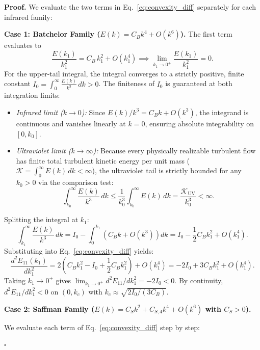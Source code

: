 \documentclass[lineno]{jfm}
\newenvironment{proof}[1][Proof]{\noindent\textbf{#1.} }{\hfill$\square$\medskip}
\begin{document}
\begin{proof}
We evaluate the two terms in Eq.~\eqref{eq:convexity_diff} separately for each infrared family:

\medskip
\noindent\textbf{Case 1: Batchelor Family ($E(k) = C_B k^4 + O(k^6)$).}
The first term evaluates to
\begin{equation}
\frac{E(k_1)}{k_1^2} = C_B\,k_1^2 + O(k_1^4) \implies \lim_{k_1 \to 0^+} \frac{E(k_1)}{k_1^2} = 0.
\end{equation}
For the upper-tail integral, the integral converges to a strictly positive, finite constant $I_0 = \int_0^\infty \frac{E(k)}{k^3}\,dk > 0$. The finiteness of $I_0$ is guaranteed at both integration limits:
\begin{itemize}
\item \emph{Infrared limit ($k \to 0$):} Since $E(k)/k^3 = C_B k + O(k^3)$, the integrand is continuous and vanishes linearly at $k=0$, ensuring absolute integrability on $[0, k_0]$.
\item \emph{Ultraviolet limit ($k \to \infty$):} Because every physically realizable turbulent flow has finite total turbulent kinetic energy per unit mass ($\mathcal{K} = \int_0^\infty E(k)\,dk < \infty$), the ultraviolet tail is strictly bounded for any $k_0 > 0$ via the comparison test:
\begin{equation}
\int_{k_0}^\infty \frac{E(k)}{k^3}\,dk \le \frac{1}{k_0^3} \int_{k_0}^\infty E(k)\,dk = \frac{\mathcal{K}_{\text{UV}}}{k_0^3} < \infty.
\end{equation}
\end{itemize}
Splitting the integral at $k_1$:
\begin{equation}
\int_{k_1}^\infty \frac{E(k)}{k^3}\,dk = I_0 - \int_0^{k_1} \left( C_B k + O(k^3) \right) dk = I_0 - \frac{1}{2} C_B k_1^2 + O(k_1^4).
\end{equation}
Substituting into Eq.~\eqref{eq:convexity_diff} yields:
\begin{equation}
\frac{d^2 E_{11}(k_1)}{d k_1^2} = 2 \left( C_B k_1^2 - I_0 + \frac{1}{2} C_B k_1^2 \right) + O(k_1^4) = -2 I_0 + 3 C_B k_1^2 + O(k_1^4).
\end{equation}
Taking $k_1 \to 0^+$ gives $\lim_{k_1 \to 0^+} d^2 E_{11}/dk_1^2 = -2 I_0 < 0$. By continuity, $d^2 E_{11}/dk_1^2 < 0$ on $(0, k_c)$ with $k_c \approx \sqrt{2I_0/(3C_B)}$.

\medskip
\noindent\textbf{Case 2: Saffman Family ($E(k) = C_S k^2 + C_{S,4} k^4 + O(k^6)$ with $C_S > 0$).}

We evaluate each term of Eq.~\eqref{eq:convexity_diff} step by step:


\end{proof}
\end{document}
